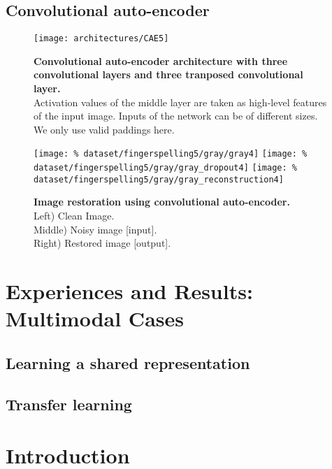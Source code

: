 \subsection{Convolutional auto-encoder}

\begin{figure}[H]
  \centering
  \texttt{[image: architectures/CAE5]}
  \caption{%
    \textbf{Convolutional auto-encoder architecture with 
      three convolutional layers and three tranposed convolutional
      layer.}\\[0.1em]
      Activation values of the middle layer are taken as 
      high-level features of the input image. Inputs of the network
      can be of different sizes. We only use valid paddings here.}
  \label{fig:CAE5}
\end{figure}

\begin{figure}[H]
  \centering
  \hfill
  \texttt{[image: \%
    dataset/fingerspelling5/gray/gray4]}
  \hfill
  \texttt{[image: \%
    dataset/fingerspelling5/gray/gray\_dropout4]}
  \hfill
  \texttt{[image: \%
    dataset/fingerspelling5/gray/gray\_reconstruction4]}
  \caption{%
    \textbf{Image restoration using convolutional auto-encoder.}\\[0.1em]
      Left) Clean Image.\\[0.1em]
      Middle) Noisy image [input].\\[0.1em]
      Right) Restored image [output].}
  \label{fig:image_restoration}
\end{figure}

\section{Experiences and Results: Multimodal Cases}

\subsection{Learning a shared representation}



\subsection{Transfer learning}

\iffalse
\section*{Introduction}

